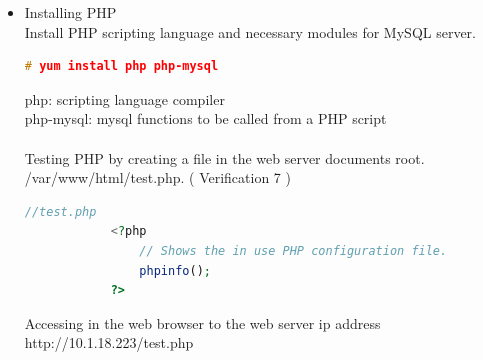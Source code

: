 \begin{itemize}
\begin{lstlisting}[language=c, stepnumber=0, tabsize=1]
				Copyright (c) 2000, 2011, Oracle and/or its affiliates. All rights reserved.

				Oracle is a registered trademark of Oracle Corporation and/or its
				affiliates. Other names may be trademarks of their respective
				owners.

				Type 'help;' or '\h' for help. Type '\c' to clear the current input statement.

				mysql> 
			\end{lstlisting}
			At this moment the database is set with username root and an empty password. For security reasons a password is set for the MySQL server.\\\\
			Changing MySQL root password
			\begin{lstlisting}[language=c, stepnumber=0, tabsize=1]
				mysql> USE mysql;
				mysql> UPDATE user SET Password=PASSWORD('new password') WHERE user='root';
				mysql> FLUSH PRIVILEGES;
			\end{lstlisting}
			With the instruction 'USE mysql' the database directory mysql is open, 'UPDATE user SET Password=PASSWORD ('new password') WHERE user='root';' the password for the user 'root' is updated to the desired one. 'FLUSH PRIVILEGES' erases the privileges in cache and reloads the privileges in the MySQL server.
		\item Installing PHP \\
		Install PHP scripting language and necessary modules for MySQL server.
		\begin{lstlisting}[language=c, stepnumber=0, tabsize=1]
			# yum install php php-mysql
		\end{lstlisting}
			php: scripting language compiler\\
			php-mysql: mysql functions to be called from a PHP script\\
		\\
		Testing PHP by creating a file in the web server documents root. /var/www/html/test.php. ( Verification 7 )
		\begin{lstlisting}[language=php, stepnumber=0, tabsize=1]
			//test.php
			<?php
				// Shows the in use PHP configuration file.
				phpinfo();
			?>
		\end{lstlisting}
		Accessing in the web browser to the web server ip address http://10.1.18.223/test.php
		\begin{figure}[H]
			\begin{centering}

\end{centering}
\end{figure}
\end{itemize}
